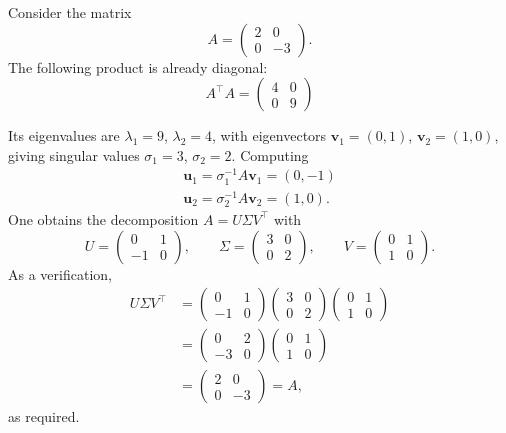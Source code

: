 \begin{example}
Consider the matrix
\[
A = \begin{pmatrix} 2 & 0 \\ 0 & -3 \end{pmatrix}.
\]
The following product is already diagonal:
\[
A^{\top}A = \begin{pmatrix} 4 & 0 \\ 0 & 9 \end{pmatrix}
\]

Its eigenvalues are $\lambda_1 = 9$, $\lambda_2 = 4$, with eigenvectors $\mathbf{v}_1 = (0,1)$, $\mathbf{v}_2 = (1,0)$, giving singular values $\sigma_1 = 3$, $\sigma_2 = 2$. Computing
\[
\begin{gathered}
\mathbf{u}_1 = \sigma_1^{-1}A\mathbf{v}_1 = (0,-1) \\
\mathbf{u}_2 = \sigma_2^{-1}A\mathbf{v}_2 = (1,0).
\end{gathered}
\]
One obtains the decomposition $A = U\Sigma V^{\top}$ with
\[
U = \begin{pmatrix} 0 & 1 \\ -1 & 0 \end{pmatrix},
\qquad
\Sigma = \begin{pmatrix} 3 & 0 \\ 0 & 2 \end{pmatrix},
\qquad
V = \begin{pmatrix} 0 & 1 \\ 1 & 0 \end{pmatrix}.
\]
As a verification,
\[
\begin{aligned}
U\Sigma V^{\top}
&= \begin{pmatrix} 0 & 1 \\ -1 & 0 \end{pmatrix}\begin{pmatrix} 3 & 0 \\ 0 & 2 \end{pmatrix}\begin{pmatrix} 0 & 1 \\ 1 & 0 \end{pmatrix} \\
&= \begin{pmatrix} 0 & 2 \\ -3 & 0 \end{pmatrix}\begin{pmatrix} 0 & 1 \\ 1 & 0 \end{pmatrix} \\
&= \begin{pmatrix} 2 & 0 \\ 0 & -3 \end{pmatrix} = A,
\end{aligned}
\]
as required.
\end{example}

